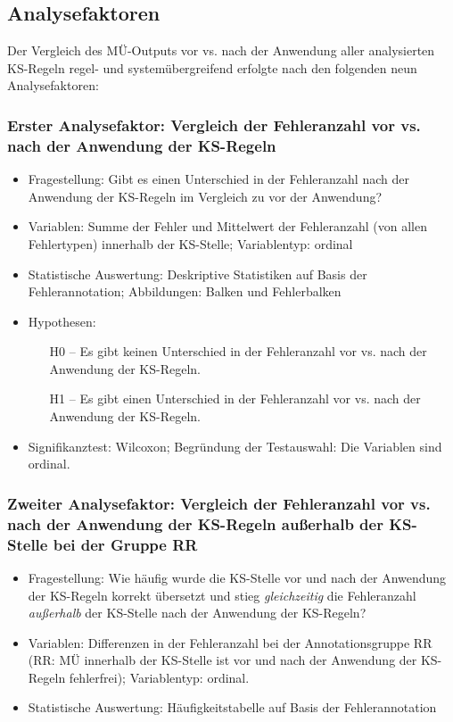\subsection{Analysefaktoren}
\label{sec:5.2.0}
Der Vergleich des MÜ-Outputs vor vs. nach der Anwendung aller analysierten KS-Regeln regel- und systemübergreifend erfolgte nach den folgenden neun Analysefaktoren:

\subsubsection{Erster Analysefaktor: Vergleich der Fehleranzahl vor vs. nach der Anwendung der KS-Regeln}

\begin{itemize}
\item Fragestellung: Gibt es einen Unterschied in der Fehleranzahl nach der Anwendung der KS-Regeln im Vergleich zu vor der Anwendung?
\item Variablen: Summe der Fehler und Mittelwert der Fehleranzahl (von allen Fehlertypen) innerhalb der KS-Stelle; Variablentyp: ordinal
\item Statistische Auswertung: Deskriptive Statistiken auf Basis der Fehlerannotation; Abbildungen: Balken und Fehlerbalken
\item Hypothesen:
  \begin{itemize}[align=left]
  \item[H0 --] Es gibt keinen Unterschied in der Fehleranzahl vor vs. nach der Anwendung der KS-Regeln.

  \item[H1 --] Es gibt einen Unterschied in der Fehleranzahl vor vs. nach der Anwendung der KS-Regeln.
  \end{itemize}
\item Signifikanztest: Wilcoxon; Begründung der Testauswahl: Die Variablen sind ordinal.
\end{itemize}

\subsubsection{Zweiter Analysefaktor: Vergleich der Fehleranzahl vor vs. nach der Anwendung der KS-Regeln außerhalb der KS-Stelle bei der Gruppe RR}

\begin{itemize}
\item Fragestellung: Wie häufig wurde die KS-Stelle vor und nach der Anwendung der KS-Regeln korrekt übersetzt und stieg \textit{gleichzeitig} die Fehleranzahl \textit{außerhalb} der KS-Stelle nach der Anwendung der KS-Regeln?
\item Variablen: Differenzen in der Fehleranzahl bei der Annotationsgruppe RR (RR: MÜ innerhalb der KS-Stelle ist vor und nach der Anwendung der KS-Regeln fehlerfrei); Variablentyp: ordinal.
\item Statistische Auswertung: Häufigkeitstabelle auf Basis der Fehlerannotation

\end{itemize}

